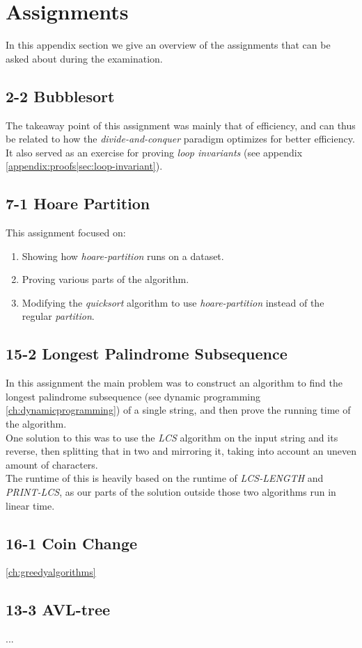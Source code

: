 
\thispagestyle{fancyplain}

\chapter{Assignments}
\label{appendix:assignments}
In this appendix section we give an overview of the assignments that can be
asked about during the examination.

\section{2-2 Bubblesort}
\label{appendix:assignments|ass:bubblesort}
The takeaway point of this assignment was mainly that of efficiency, and can
thus be related to how the \textit{divide-and-conquer} paradigm optimizes for
better efficiency. It also served as an exercise for proving \textit{loop
invariants} (see appendix \ref{appendix:proofs|sec:loop-invariant}).

\section{7-1 Hoare Partition}
\label{appendix:assignments|ass:hoare-partition}
This assignment focused on:
\begin{enumerate}
\item Showing how \textit{hoare-partition} runs on a dataset.
\item Proving various parts of the algorithm.
\item Modifying the \textit{quicksort} algorithm to use \textit{hoare-partition} 
instead of the regular \textit{partition}.
\end{enumerate}

\section{15-2 Longest Palindrome Subsequence}
\label{appendix:assignments|ass:longest-palindromic-subsequence}
In this assignment the main problem was to construct an algorithm to find the 
longest palindrome subsequence 
(see dynamic programming \ref{ch:dynamicprogramming}) of a single string, and 
then prove the running time of the algorithm.\\
One solution to this was to use the \textit{LCS} algorithm on the input string 
and its reverse, then splitting that in two and mirroring it, taking into account 
an uneven amount of characters.\\
The runtime of this is heavily based on the runtime of \textit{LCS-LENGTH} and 
\textit{PRINT-LCS}, as our parts of the solution outside those two algorithms run 
in linear time.

\section{16-1 Coin Change}
\label{appendix:assignments|ass:coin-change}
\ref{ch:greedyalgorithms}

\section{13-3 AVL-tree}
\label{appendix:assignments|ass:avl-tree}
...